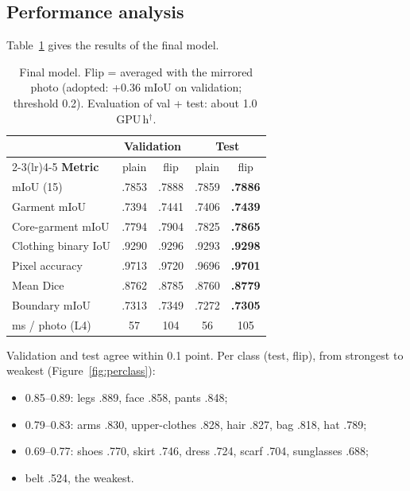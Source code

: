 \documentclass[conference,a4paper]{IEEEtran}
\newcommand{\est}{$^{\dagger}$}
\begin{document}
\subsection{Performance analysis}
\label{sec:perf}

Table~\ref{tab:final} gives the results of the final model.

\begin{table}[!htbp]\centering\footnotesize
\caption{Final model. Flip = averaged with the mirrored photo (adopted: +0.36 mIoU on validation; threshold 0.2). Evaluation of val + test: about 1.0\,GPU\,h\est.}\label{tab:final}
\begin{tabular}{@{}lcccc@{}}
\toprule
& \multicolumn{2}{c}{\textbf{Validation}} & \multicolumn{2}{c}{\textbf{Test}}\\
\cmidrule(lr){2-3}\cmidrule(lr){4-5}
\textbf{Metric} & plain & flip & plain & flip\\
\midrule
mIoU (15) & .7853 & .7888 & .7859 & \textbf{.7886}\\
Garment mIoU & .7394 & .7441 & .7406 & \textbf{.7439}\\
Core-garment mIoU & .7794 & .7904 & .7825 & \textbf{.7865}\\
Clothing binary IoU & .9290 & .9296 & .9293 & \textbf{.9298}\\
Pixel accuracy & .9713 & .9720 & .9696 & \textbf{.9701}\\
Mean Dice & .8762 & .8785 & .8760 & \textbf{.8779}\\
Boundary mIoU & .7313 & .7349 & .7272 & \textbf{.7305}\\
ms / photo (L4) & 57 & 104 & 56 & 105\\
\bottomrule
\end{tabular}
\end{table}

\noindent Validation and test agree within 0.1 point. Per class (test, flip), from strongest to weakest (Figure~\ref{fig:perclass}):
\begin{itemize}
  \item 0.85--0.89: legs .889, face .858, pants .848;
  \item 0.79--0.83: arms .830, upper-clothes .828, hair .827, bag .818, hat .789;
  \item 0.69--0.77: shoes .770, skirt .746, dress .724, scarf .704, sunglasses .688;
  \item belt .524, the weakest.
\end{itemize}
\end{document}
